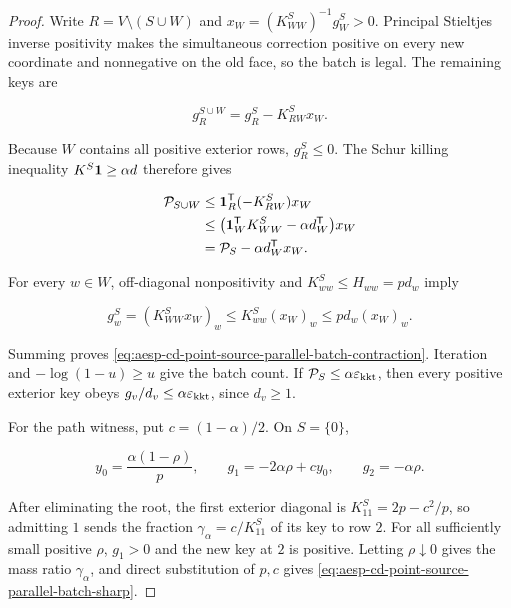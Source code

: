 \begin{proof}
Write \(R=V\setminus(S\cup W)\) and
\(x_W=(K^S_{WW})^{-1}g^S_W>0\).  Principal Stieltjes inverse positivity
makes the simultaneous correction positive on every new coordinate and
nonnegative on the old face, so the batch is legal.  The remaining keys are

\begin{equation*}
 g^{S\cup W}_R
 =g^S_R-K^S_{RW}x_W.
\end{equation*}

Because \(W\) contains all positive exterior rows, \(g^S_R\leq0\).  The
Schur killing inequality \(K^S\mathbf{1}\geq\alpha d\) therefore gives

\begin{align*}
 \mathcal P_{S\cup W}
 &\leq \mathbf{1}_R^{\mathsf T}(-K^S_{RW})x_W\\
 &\leq
 \bigl(\mathbf{1}_W^{\mathsf T}K^S_{WW}-\alpha d_W^{\mathsf T}\bigr)x_W\\
 &=\mathcal P_S-\alpha d_W^{\mathsf T}x_W.
\end{align*}

For every \(w\in W\), off-diagonal nonpositivity and
\(K^S_{ww}\leq H_{ww}=pd_w\) imply

\begin{equation*}
 g^S_w=(K^S_{WW}x_W)_w
 \leq K^S_{ww}(x_W)_w
 \leq pd_w(x_W)_w.
\end{equation*}

Summing proves
\cref{eq:aesp-cd-point-source-parallel-batch-contraction}.  Iteration and
\(-\log(1-u)\geq u\) give the batch count.  If
\(\mathcal P_S\leq\alpha\varepsilon_{\mathrm{kkt}}\), then every positive exterior key obeys
\(g_v/d_v\leq\alpha\varepsilon_{\mathrm{kkt}}\), since \(d_v\geq1\).

For the path witness, put \(c=(1-\alpha)/2\).  On \(S=\{0\}\),

\begin{equation*}
 y_0=\frac{\alpha(1-\rho)}p,
 \qquad
 g_1=-2\alpha\rho+cy_0,
 \qquad
 g_2=-\alpha\rho.
\end{equation*}

After eliminating the root, the first exterior diagonal is
\(K^S_{11}=2p-c^2/p\), so admitting \(1\) sends the fraction
\(\gamma_\alpha=c/K^S_{11}\) of its key to row \(2\).  For all sufficiently
small positive \(\rho\), \(g_1>0\) and the new key at \(2\) is positive.
Letting \(\rho\downarrow0\) gives the mass ratio \(\gamma_\alpha\), and
direct substitution of \(p,c\) gives
\cref{eq:aesp-cd-point-source-parallel-batch-sharp}.
\end{proof}

